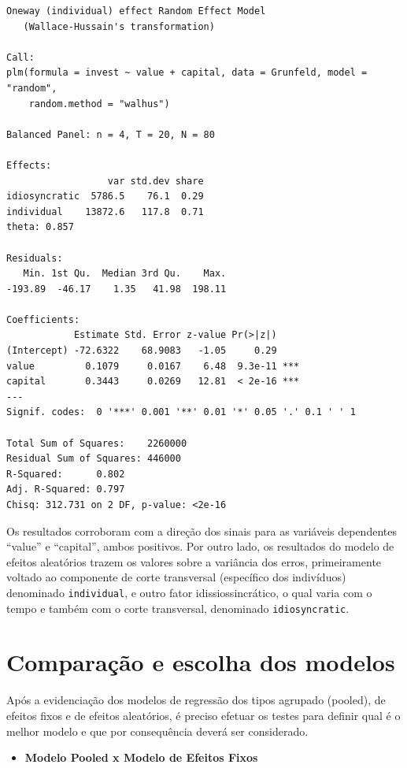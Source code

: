 \documentclass[12pt,brazil,oneside]{book}
\providecommand{\tightlist}{%
  \setlength{\itemsep}{0pt}\setlength{\parskip}{0pt}}
\begin{document}
\begin{verbatim}
Oneway (individual) effect Random Effect Model 
   (Wallace-Hussain's transformation)

Call:
plm(formula = invest ~ value + capital, data = Grunfeld, model = "random", 
    random.method = "walhus")

Balanced Panel: n = 4, T = 20, N = 80

Effects:
                  var std.dev share
idiosyncratic  5786.5    76.1  0.29
individual    13872.6   117.8  0.71
theta: 0.857

Residuals:
   Min. 1st Qu.  Median 3rd Qu.    Max. 
-193.89  -46.17    1.35   41.98  198.11 

Coefficients:
            Estimate Std. Error z-value Pr(>|z|)    
(Intercept) -72.6322    68.9083   -1.05     0.29    
value         0.1079     0.0167    6.48  9.3e-11 ***
capital       0.3443     0.0269   12.81  < 2e-16 ***
---
Signif. codes:  0 '***' 0.001 '**' 0.01 '*' 0.05 '.' 0.1 ' ' 1

Total Sum of Squares:    2260000
Residual Sum of Squares: 446000
R-Squared:      0.802
Adj. R-Squared: 0.797
Chisq: 312.731 on 2 DF, p-value: <2e-16
\end{verbatim}

Os resultados corroboram com a direção dos sinais para as variáveis dependentes ``value'' e ``capital'', ambos positivos. Por outro lado, os resultados do modelo de efeitos aleatórios trazem os valores sobre a variância dos erros, primeiramente voltado ao componente de corte transversal (específico dos indivíduos) denominado \texttt{individual}, e outro fator idissiossincrático, o qual varia com o tempo e também com o corte transversal, denominado \texttt{idiosyncratic}.

\hypertarget{comparacao-e-escolha-dos-modelos}{%
\section{Comparação e escolha dos modelos}\label{comparacao-e-escolha-dos-modelos}}

Após a evidenciação dos modelos de regressão dos tipos agrupado (pooled), de efeitos fixos e de efeitos aleatórios, é preciso efetuar os testes para definir qual é o melhor modelo e que por consequência deverá ser considerado.

\begin{itemize}
\tightlist
\item
  \textbf{Modelo Pooled x Modelo de Efeitos Fixos}
\end{itemize}
\end{document}
